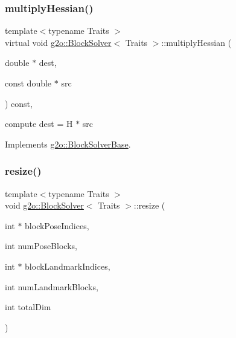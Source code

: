 \subsubsection{\texorpdfstring{multiply\+Hessian()}{multiplyHessian()}}
{\footnotesize\ttfamily template$<$typename Traits $>$ \\
virtual void \mbox{\hyperlink{classg2o_1_1_block_solver}{g2o\+::\+Block\+Solver}}$<$ Traits $>$\+::multiply\+Hessian (\begin{DoxyParamCaption}\item[{double $\ast$}]{dest,  }\item[{const double $\ast$}]{src }\end{DoxyParamCaption}) const\hspace{0.3cm}{\ttfamily [inline]}, {\ttfamily [virtual]}}

compute dest = H $\ast$ src 

Implements \mbox{\hyperlink{classg2o_1_1_block_solver_base_a4ff7072751bfa1b7fcf91f8219e18e13}{g2o\+::\+Block\+Solver\+Base}}.

\mbox{\label{classg2o_1_1_block_solver_a0075af2df18364cf99fd80f813b8ce4b}} 
\subsubsection{\texorpdfstring{resize()}{resize()}}
{\footnotesize\ttfamily template$<$typename Traits $>$ \\
void \mbox{\hyperlink{classg2o_1_1_block_solver}{g2o\+::\+Block\+Solver}}$<$ Traits $>$\+::resize (\begin{DoxyParamCaption}\item[{int $\ast$}]{block\+Pose\+Indices,  }\item[{int}]{num\+Pose\+Blocks,  }\item[{int $\ast$}]{block\+Landmark\+Indices,  }\item[{int}]{num\+Landmark\+Blocks,  }\item[{int}]{total\+Dim }\end{DoxyParamCaption})\hspace{0.3cm}{\ttfamily [protected]}}

\mbox{\label{classg2o_1_1_block_solver_a2136931d7aa2f54df5207556c4685809}} 
